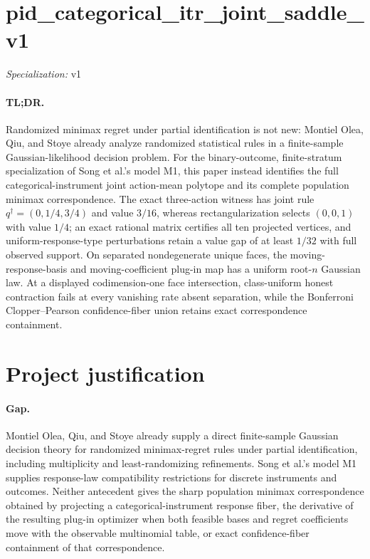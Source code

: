\documentclass{article}
\begin{document}
\sloppy

\section*{pid\_\allowbreak{}categorical\_\allowbreak{}itr\_\allowbreak{}joint\_\allowbreak{}saddle\_\allowbreak{}v1}

\noindent\textit{Specialization:} v1\par

\paragraph{TL;DR.} Randomized minimax regret under partial identification is not new: Montiel Olea, Qiu, and Stoye already analyze randomized statistical rules in a finite-sample Gaussian-likelihood decision problem.  For the binary-outcome, finite-stratum specialization of Song et al.'s model M1, this paper instead identifies the full categorical-instrument joint action-mean polytope and its complete population minimax correspondence.  The exact three-action witness has joint rule \(q^\dagger=(0,1/4,3/4)\) and value \(3/16\), whereas rectangularization selects \((0,0,1)\) with value \(1/4\); an exact rational matrix certifies all ten projected vertices, and uniform-response-type perturbations retain a value gap of at least \(1/32\) with full observed support.  On separated nondegenerate unique faces, the moving-response-basis and moving-coefficient plug-in map has a uniform root-\(n\) Gaussian law.  At a displayed codimension-one face intersection, class-uniform honest contraction fails at every vanishing rate absent separation, while the Bonferroni Clopper--Pearson confidence-fiber union retains exact correspondence containment.

\section{Project justification}

\paragraph{Gap.} Montiel Olea, Qiu, and Stoye already supply a direct finite-sample Gaussian decision theory for randomized minimax-regret rules under partial identification, including multiplicity and least-randomizing refinements.  Song et al.'s model M1 supplies response-law compatibility restrictions for discrete instruments and outcomes.  Neither antecedent gives the sharp population minimax correspondence obtained by projecting a categorical-instrument response fiber, the derivative of the resulting plug-in optimizer when both feasible bases and regret coefficients move with the observable multinomial table, or exact confidence-fiber containment of that correspondence.
\end{document}
